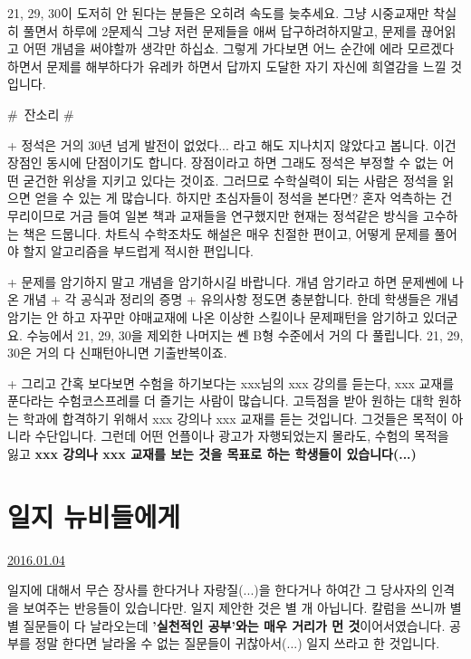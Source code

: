 21, 29, 30이 도저히 안 된다는 분들은 오히려 속도를 늦추세요.
그냥 시중교재만 착실히 풀면서 하루에 2문제식 그냥 저런 문제들을 애써 답구하려하지말고, 문제를 끊어읽고 어떤 개념을 써야할까 생각만 하십쇼.
그렇게 가다보면 어느 순간에 에라 모르겠다 하면서 문제를 해부하다가 유레카 하면서 답까지 도달한 자기 자신에 희열감을 느낄 것입니다.
\vspace{5mm}

$\#$ 잔소리 $\#$
\vspace{5mm}

+ 정석은 거의 30년 넘게 발전이 없었다... 라고 해도 지나치지 않았다고 봅니다.
이건 장점인 동시에 단점이기도 합니다. 장점이라고 하면 그래도 정석은 부정할 수 없는 어떤 굳건한 위상을 지키고 있다는 것이죠.
그러므로 수학실력이 되는 사람은 정석을 읽으면 얻을 수 있는 게 많습니다.
하지만 초심자들이 정석을 본다면?
혼자 억측하는 건 무리이므로 거금 들여 일본 책과 교재들을 연구했지만 현재는 정석같은 방식을 고수하는 책은 드뭅니다.
차트식 수학조차도 해설은 매우 친절한 편이고, 어떻게 문제를 풀어야 할지 알고리즘을 부드럽게 적시한 편입니다.
\vspace{5mm}

+ 문제를 암기하지 말고 개념을 암기하시길 바랍니다.
개념 암기라고 하면 문제쎈에 나온 개념 + 각 공식과 정리의 증명 + 유의사항 정도면 충분합니다.
한데 학생들은 개념 암기는 안 하고 자꾸만 야매교재에 나온 이상한 스킬이나 문제패턴을 암기하고 있더군요.
수능에서 21, 29, 30을 제외한 나머지는 쎈 B형 수준에서 거의 다 풀립니다. 21, 29, 30은 거의 다 신패턴아니면 기출반복이죠.
\vspace{5mm}

+ 그리고 간혹 보다보면 수험을 하기보다는 xxx님의 xxx 강의를 듣는다, xxx 교재를 푼다라는 수험코스프레를 더 즐기는 사람이 많습니다.
고득점을 받아 원하는 대학 원하는 학과에 합격하기 위해서 xxx 강의나 xxx 교재를 듣는 것입니다. 그것들은 목적이 아니라 수단입니다.
그런데 어떤 언플이나 광고가 자행되었는지 몰라도, 수험의 목적을 잃고 \textbf{xxx 강의나 xxx 교재를 보는 것을 목표로 하는 학생들이 있습니다(...)}
\vspace{5mm}






\section{일지 뉴비들에게}
\href{https://www.kockoc.com/Apoc/575186}{2016.01.04}

\vspace{5mm}

일지에 대해서 무슨 장사를 한다거나 자랑질(...)을 한다거나 하여간 그 당사자의 인격을 보여주는 반응들이 있습니다만.
일지 제안한 것은 별 개 아닙니다.
칼럼을 쓰니까 별별 질문들이 다 날라오는데 \textbf{'실천적인 공부'와는 매우 거리가 먼 것}이어서였습니다.
공부를 정말 한다면 날라올 수 없는 질문들이 귀찮아서(...) 일지 쓰라고 한 것입니다.
\vspace{5mm}

